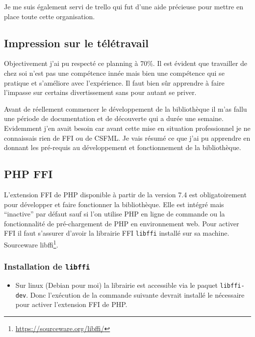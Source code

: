 \documentclass[11pt,a4paper,krantz2,11pt,oneside]{krantz}
\providecommand{\tightlist}{%
  \setlength{\itemsep}{0pt}\setlength{\parskip}{0pt}}
\renewcommand{\href}[2]{#2\footnote{\url{#1}}}
\begin{document}
Je me suis également servi de trello qui fut d'une aide précieuse pour mettre en place toute cette organisation.

\hypertarget{impression-sur-le-tuxe9luxe9travail}{%
\subsection{Impression sur le télétravail}\label{impression-sur-le-tuxe9luxe9travail}}

Objectivement j'ai pu respecté ce planning à 70\%. Il est évident que travailler de chez soi n'est pas une compétence innée mais bien une compétence qui se pratique et s'améliore avec l'expérience. Il faut bien sûr apprendre à faire l'impasse sur certains divertissement sans pour autant se priver.

Avant de réellement commencer le développement de la bibliothèque il m'as fallu une période de documentation et de découverte qui a durée une semaine. Evidemment j'en avait besoin car avant cette mise en situation professionnel je ne connaissais rien de FFI ou de CSFML. Je vais résumé ce que j'ai pu apprendre en donnant les pré-requis au développement et fonctionnement de la bibliothèque.

\hypertarget{php-ffi}{%
\subsection{PHP FFI}\label{php-ffi}}

L'extension FFI de PHP disponible à partir de la version 7.4 est obligatoirement pour développer et faire fonctionner la bibliothèque. Elle est intégré mais ``inactive'' par défaut \citep{the_php_group_ffi_2019} sauf si l'on utilise PHP en ligne de commande ou la fonctionnalité de pré-chargement de PHP en environnement web. Pour activer FFI il faut s'assurer d'avoir la librairie FFI \texttt{libffi} installé sur sa machine. \href{https://sourceware.org/libffi/}{Sourceware libffi}.

\hypertarget{installation-de-libffi}{%
\subsubsection{\texorpdfstring{Installation de \texttt{libffi}}{Installation de libffi}}\label{installation-de-libffi}}

\begin{itemize}
\tightlist
\item
  Sur linux (Debian pour moi) la librairie est accessible via le paquet \texttt{libffi-dev}. Donc l'exécution de la commande suivante devrait installé le nécessaire pour activer l'extension FFI de PHP.
\end{itemize}
\end{document}
